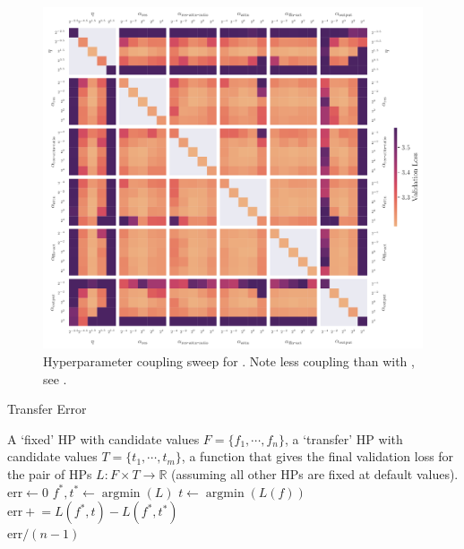 \begin{figure}[h]
    \centering
    \includegraphics[width=\textwidth]{arXiv/figures/mult_grid_u-mup_val.pdf}
    \caption{Hyperparameter coupling sweep for \umup{}. Note less coupling than with \mup{}, see .}
    \label{fig:additional_experiments:mult_grid_umup}
\end{figure}

\begin{algorithm}
\caption{Transfer Error} \label{alg:transfer_error}
\begin{algorithmic}
\Require A `fixed' HP with candidate values $F = \{f_1, \cdots, f_n\}$,
a `transfer' HP with candidate values $T = \{t_1, \cdots, t_m\}$, a function that gives the final validation loss for the pair of HPs $L : F \times T \to \mathbb{R}$ (assuming all other HPs are fixed at default values).
\\
\State $\mathrm{err} \gets 0$
\State $f^*, t^* \gets \operatorname{argmin}(L)$
        \State $t \gets \operatorname{argmin}(L(f))$
        \State $\mathrm{err} \mathrel{+}= L(f^*, t) - L(f^*, t^*)$
    \EndIf
\EndFor
\\
\Return $\mathrm{err}/ (n - 1)$
\end{algorithmic}
\end{algorithm}

\FloatBarrier
\clearpage

